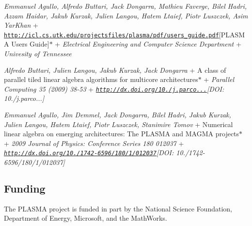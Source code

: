 {\itshape Emmanuel Agullo, Alfredo Buttari, Jack Dongarra, Mathieu Faverge, Bilel Hadri, Azzam Haidar, Jakub Kurzak, Julien Langou, Hatem Ltaief, Piotr Luszczek, Asim Yar\+Khan} + \href{http://icl.cs.utk.edu/projectsfiles/plasma/pdf/users_guide.pdf}{\tt http\+://icl.\+cs.\+utk.\+edu/projectsfiles/plasma/pdf/users\+\_\+guide.\+pdf}\mbox{[}P\+L\+A\+S\+M\+A Users\textquotesingle{} Guide\mbox{]}$\ast$ + {\itshape Electrical Engineering and Computer Science Department} + {\itshape Univesity of Tennessee}

{\itshape Alfredo Buttari, Julien Langou, Jakub Kurzak, Jack Dongarra} + A class of parallel tiled linear algebra algorithms for multicore architectures$\ast$ + {\itshape Parallel Computing 35 (2009) 38-\/53} + {\itshape \href{http://dx.doi.org/10.1016/j.parco.2008.10.002}{\tt http\+://dx.\+doi.\+org/10./j.\+parco...}\mbox{[}D\+O\+I\+: 10./j.parco...\mbox{]}}

{\itshape Emmanuel Agullo, Jim Demmel, Jack Dongarra, Bilel Hadri, Jakub Kurzak, Julien Langou, Hatem Ltaief, Piotr Luszczek, Stanimire Tomov} + Numerical linear algebra on emerging architectures\+: The P\+L\+A\+S\+M\+A and M\+A\+G\+M\+A projects$\ast$ + {\itshape 2009 Journal of Physics\+: Conference Series 180 012037} + {\itshape \href{http://dx.doi.org/10.1088/1742-6596/180/1/012037}{\tt http\+://dx.\+doi.\+org/10./1742-\/6596/180/1/012037}\mbox{[}D\+O\+I\+: 10./1742-\/6596/180/1/012037\mbox{]}}

\subsection*{Funding }

The P\+L\+A\+S\+M\+A project is funded in part by the National Science Foundation, Department of Energy, Microsoft, and the Math\+Works. 